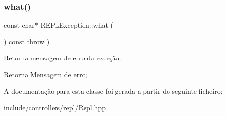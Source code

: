 \subsubsection{\texorpdfstring{what()}{what()}}
{\footnotesize\ttfamily const char$\ast$ R\+E\+P\+L\+Exception\+::what (\begin{DoxyParamCaption}{ }\end{DoxyParamCaption}) const throw  ) \hspace{0.3cm}{\ttfamily [inline]}}

Retorna mensagem de erro da exceção. \begin{DoxyReturn}{Retorna}
Mensagem de erro;. 
\end{DoxyReturn}


A documentação para esta classe foi gerada a partir do seguinte ficheiro\+:\begin{DoxyCompactItemize}
\item 
include/controllers/repl/\hyperlink{Repl_8hpp}{Repl.\+hpp}\end{DoxyCompactItemize}
